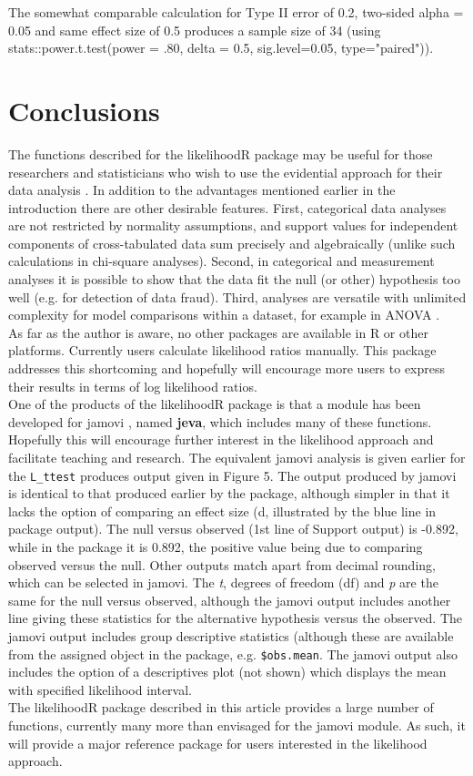 The somewhat comparable calculation for Type II error of 0.2, two-sided alpha = 0.05 and same effect size of 0.5 produces a sample size of 34 (using stats::power.t.test(power = .80, delta = 0.5, sig.level=0.05, type="paired")). 
 
\section{Conclusions}
The functions described for the likelihoodR package may be useful for those researchers and statisticians who wish to use the evidential approach for their data analysis \citep{Cahusaca:2020}. In addition to the advantages mentioned earlier in the introduction there are other desirable features. First, categorical data analyses are not restricted by normality assumptions, and support values for independent components of cross-tabulated data sum precisely and algebraically (unlike such calculations in chi-square analyses). Second, in categorical and measurement analyses it is possible to show that the data fit the null (or other) hypothesis too well (e.g. for detection of data fraud). Third, analyses are versatile with unlimited complexity for model comparisons within a dataset, for example in ANOVA \citep{GloverDixon:2004}.\\
As far as the author is aware, no other packages are available in R or other platforms. Currently users calculate likelihood ratios manually. This package addresses this shortcoming and hopefully will encourage more users to express their results in terms of log likelihood ratios.\\ 
One of the products of the likelihoodR package is that a module has been developed for jamovi \citep{jamovi}, named \textbf{jeva}, which includes many of these functions. Hopefully this will encourage further interest in the likelihood approach and facilitate teaching and research. The equivalent jamovi analysis is given earlier for the \texttt{L\_ttest} produces output given in Figure 5. The output produced by jamovi is identical to that produced earlier by the package, although simpler in that it lacks the option of comparing an effect size (d, illustrated by the blue line in package output). The null versus observed (1st line of Support output) is -0.892, while in the package it is 0.892, the positive value being due to comparing observed versus the null. Other outputs match apart from decimal rounding, which can be selected in jamovi. The \emph{t}, degrees of freedom (df) and \emph{p} are the same for the null versus observed, although the jamovi output includes another line giving these statistics for the alternative hypothesis versus the observed. The jamovi output includes group descriptive statistics (although these are available from the assigned object in the package, e.g. \texttt{\$obs.mean}. The jamovi output also includes the option of a descriptives plot (not shown) which displays the mean with specified likelihood interval.\\
The likelihoodR package described in this article provides a large number of functions, currently many more than envisaged for the jamovi module. As such, it will provide a major reference package for users interested in the likelihood approach.\\

